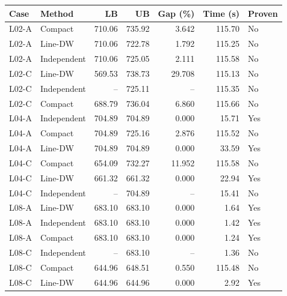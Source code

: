 \begin{tabular}{llrrrrl}
\hline
Case & Method & LB & UB & Gap (\%) & Time (s) & Proven \\
\hline
L02-A & Compact & 710.06 & 735.92 & 3.642 & 115.70 & No \\
L02-A & Line-DW & 710.06 & 722.78 & 1.792 & 115.25 & No \\
L02-A & Independent & 710.06 & 725.05 & 2.111 & 115.58 & No \\
L02-C & Line-DW & 569.53 & 738.73 & 29.708 & 115.13 & No \\
L02-C & Independent & -- & 725.11 & -- & 115.35 & No \\
L02-C & Compact & 688.79 & 736.04 & 6.860 & 115.66 & No \\
L04-A & Independent & 704.89 & 704.89 & 0.000 & 15.71 & Yes \\
L04-A & Compact & 704.89 & 725.16 & 2.876 & 115.52 & No \\
L04-A & Line-DW & 704.89 & 704.89 & 0.000 & 33.59 & Yes \\
L04-C & Compact & 654.09 & 732.27 & 11.952 & 115.58 & No \\
L04-C & Line-DW & 661.32 & 661.32 & 0.000 & 22.94 & Yes \\
L04-C & Independent & -- & 704.89 & -- & 15.41 & No \\
L08-A & Line-DW & 683.10 & 683.10 & 0.000 & 1.64 & Yes \\
L08-A & Independent & 683.10 & 683.10 & 0.000 & 1.42 & Yes \\
L08-A & Compact & 683.10 & 683.10 & 0.000 & 1.24 & Yes \\
L08-C & Independent & -- & 683.10 & -- & 1.36 & No \\
L08-C & Compact & 644.96 & 648.51 & 0.550 & 115.48 & No \\
L08-C & Line-DW & 644.96 & 644.96 & 0.000 & 2.92 & Yes \\
\hline
\end{tabular}
